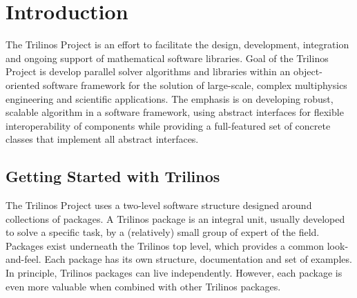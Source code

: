 % 
% 
% 
%  
%  
% 

\section{Introduction}

The Trilinos Project is an effort to facilitate the design, development,
integration and ongoing support of mathematical software libraries.
Goal of the Trilinos Project is develop parallel solver algorithms and
libraries within an object-oriented software framework for the solution
of large-scale, complex multiphysics engineering and scientific
applications. The emphasis is on developing robust, scalable algorithm
in a software framework, using abstract interfaces for flexible
interoperability of components while providing a full-featured set of
concrete classes that implement all abstract interfaces.


\subsection{Getting Started with Trilinos}
\label{sec:getting}

The Trilinos Project uses a two-level software structure designed around
collections of packages. A Trilinos package is an integral unit, usually
developed to solve a specific task, by a (relatively) small group of
expert of the field.  Packages exist underneath the Trilinos top level,
which provides a common look-and-feel. Each package has its own
structure, documentation and set of examples. In principle, Trilinos
packages can live independently. However, each package is even more
valuable when combined with other Trilinos packages.

